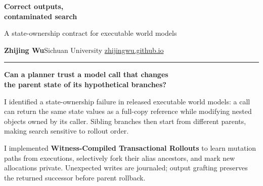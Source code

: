 \documentclass[10pt]{article}
\begin{document}
\bodyfont
{}
\vspace{4pt}
{\fontsize{25}{28}\selectfont\bfseries\color{Navy}
Correct outputs,\\contaminated search\par}
\vspace{5pt}
{\fontsize{12}{15}\selectfont\color{Muted}
A state-ownership contract for executable world models\par}
\vspace{6pt}
{\fontsize{10.7}{14}\selectfont
\textbf{Zhijing Wu}\quad\textcolor{Muted}{Sichuan University}\hfill
\href{https://zhijingwu.github.io/}{zhijingwu.github.io}\par}
\vspace{5pt}
{\color{Rule}\rule{\linewidth}{.7pt}}\par
\vspace{3pt}
{\fontsize{13.1}{17}\selectfont\bfseries\color{Navy}
Can a planner trust a model call that changes\\
the parent state of its hypothetical branches?\par}
\vspace{2pt}
I identified a state-ownership failure in released executable world models:
a call can return the same state values as a full-copy reference while
modifying nested objects owned by its caller. Sibling branches then start
from different parents, making search sensitive to rollout order.

\vspace{3pt}
\par
{}

I implemented \textbf{Witness-Compiled Transactional Rollouts} to learn mutation
paths from executions, selectively fork their alias ancestors, and mark new
allocations private. Unexpected writes are journaled; output grafting preserves
the returned successor before parent rollback.\par
\vspace{2pt}
\par
{}
\end{document}
